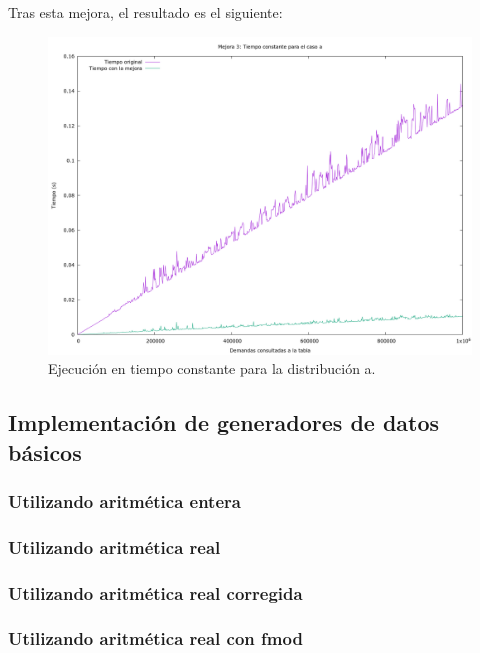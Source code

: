 \documentclass[12pt, spanish]{article}
\begin{document}
Tras esta mejora, el resultado es el siguiente:

\begin{figure}[H]
	\centering
	\includegraphics[scale = 0.2]{t_mejora3.png}
	\caption{Ejecución en tiempo constante para la distribución a.}
	\label{fig:ej1_a_150000}

\end{figure}

\subsection{Implementación de generadores de datos básicos}

\subsubsection{Utilizando aritmética entera}


\subsubsection{Utilizando aritmética real}


\subsubsection{Utilizando aritmética real corregida}



\subsubsection{Utilizando aritmética real con fmod}

%
%
\end{document}
